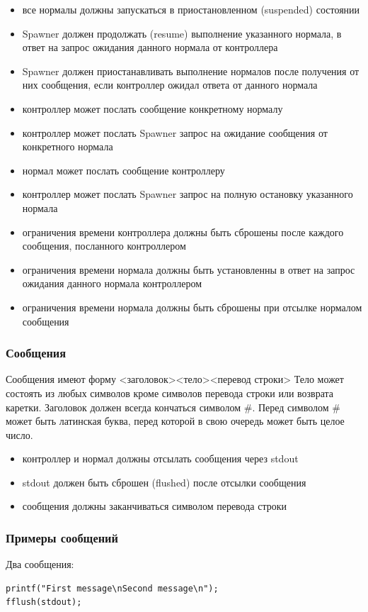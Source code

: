 \documentclass{imcs}
\begin{document}
\begin{itemize}
\item все нормалы должны запускаться в приостановленном (suspended) состоянии
\item Spawner должен продолжать (resume) выполнение указанного нормала, в ответ на запрос ожидания данного нормала от контроллера
\item Spawner должен приостанавливать выполнение нормалов после получения от них сообщения, если контроллер ожидал ответа от данного нормала
\item контроллер может послать сообщение конкретному нормалу
\item контроллер может послать Spawner запрос на ожидание сообщения от конкретного нормала
\item нормал может послать сообщение контроллеру
\item контроллер может послать Spawner запрос на полную остановку указанного нормала
\item ограничения времени контроллера должны быть сброшены после каждого сообщения, посланного контроллером
\item ограничения времени нормала должны быть установленны в ответ на запрос ожидания данного нормала контроллером
\item ограничения времени нормала должны быть сброшены при отсылке нормалом сообщения
\end{itemize}

\subsubsection{Сообщения}
Сообщения имеют форму <заголовок><тело><перевод строки> Тело может состоять из любых символов кроме символов перевода строки или возврата каретки. Заголовок должен всегда кончаться символом \#. Перед символом \# может быть латинская буква, перед которой в свою очередь может быть целое число.

\begin{itemize}
\item контроллер и нормал должны отсылать сообщения через stdout
\item stdout должен быть сброшен (flushed) после отсылки сообщения
\item сообщения должны заканчиваться символом перевода строки
\end{itemize}

\subsubsection{Примеры сообщений}
Два сообщения:
\begin{lstlisting}
printf("First message\nSecond message\n");
fflush(stdout);
\end{lstlisting}
\end{document}

